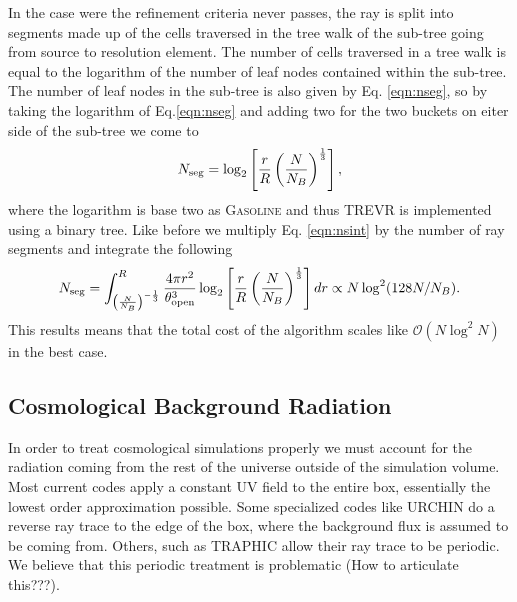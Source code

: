 \documentclass[fleq,usenatbib]{mnras}
\newcommand{\acro}{TREVR}
\newcommand{\bigO}[1]{\mathcal{O}\left(#1\right)}
\newcommand{\tO}{\theta_{\rm open}}
\begin{document}
In the case were the refinement criteria never passes, the ray is split into 
segments made up of the cells traversed in the tree walk of the sub-tree going 
from source to resolution element. The number of cells traversed in a tree walk
is equal to the logarithm of the number of leaf nodes contained within the 
sub-tree. The number of leaf nodes in the sub-tree is also given by Eq. 
\ref{eqn:nseg}, so by taking the logarithm of Eq.\ref{eqn:nseg} and adding two 
for the two buckets on eiter side of the sub-tree we come to
\begin{equation}
\label{eqn:nseg2}
N_{\rm seg} = \log_2\left[\frac{r}{R}\left(
\frac{N}{N_B}\right)^\frac{1}{3}\right],
\end{equation}
where the logarithm is base two as \textsc{Gasoline} and thus \acro{} is 
implemented using a binary tree. Like before we multiply Eq. \ref{eqn:nsint} 
by the number of ray segments and integrate the following
\begin{equation}
\label{eqn:nsegint2}
N_{\rm seg} = \int_{\left(\frac{N}{N_B}\right)^{-\frac{1}{3}}}^R 
\frac{4\pi r^2}{\tO^3}
\log_2\left[\frac{r}{R}\left(
\frac{N}{N_B}\right)^\frac{1}{3}\right] dr
\propto N\log^2(128 N/N_B).
\end{equation}
This results means that the total cost of the algorithm scales like 
$\bigO{N\log^2N}$ in the best case.

\subsection{Cosmological Background Radiation}
In order to treat cosmological simulations properly we must account for the 
radiation coming from the rest of the universe outside of the simulation 
volume. Most current codes apply a constant UV field to the entire box, 
essentially the lowest order approximation possible. Some specialized codes 
like URCHIN \citep{altayTheuns13} do a reverse ray trace to the edge of the 
box, where the background flux is assumed to be coming from. Others, such as 
TRAPHIC \citep{pawlikSchaye08} allow their ray trace to be periodic. We believe
that this periodic treatment is problematic (How to articulate this???). 
\end{document}

